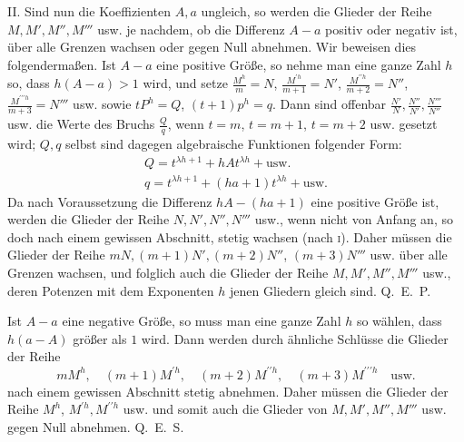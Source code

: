 II. Sind nun die Koeffizienten $A,a$ ungleich, so werden die Glieder der Reihe $M,M',M'',M'''$ usw. je nachdem, ob die Differenz $A-a$ positiv oder negativ ist, über alle Grenzen wachsen oder gegen Null abnehmen. Wir beweisen dies folgendermaßen. Ist $A-a$ eine positive Größe, so nehme man eine ganze Zahl $h$ so, dass $h(A-a)>1$ wird, und setze $\frac{M^h}{m}=N$, $\frac{M^{\prime h}}{m+1}=N'$, $\frac{M^{\prime\prime h}}{m+2}=N''$, $\frac{M^{\prime\prime\prime h}}{m+3}=N'''$ usw. sowie $tP^h=Q$, $(t+1)p^h=q$. Dann sind offenbar $\frac{N'}{N},\frac{N''}{N'},\frac{N'''}{N''}$ usw. die Werte des Bruchs $\frac{Q}{q}$, wenn $t=m$, $t=m+1$, $t=m+2$ usw. gesetzt wird; $Q,q$ selbst sind dagegen algebraische Funktionen folgender Form:
\[
\begin{array}{l}
Q=t^{\lambda h+1}+hAt^{\lambda h}+\mathrm{usw.}\\
q=t^{\lambda h+1}+(ha+1)t^{\lambda h}+\mathrm{usw.}
\end{array}
\]
Da nach Voraussetzung die Differenz $hA-(ha+1)$ eine positive Größe ist, werden die Glieder der Reihe $N,N',N'',N'''$ usw., wenn nicht von Anfang an, so doch nach einem gewissen Abschnitt, stetig wachsen (nach \textsc{i}). Daher müssen die Glieder der Reihe $mN,(m+1)N',(m+2)N''$, $(m+3)N'''$ usw. über alle Grenzen wachsen, und folglich auch die Glieder der Reihe $M,M',M'',M'''$ usw., deren Potenzen mit dem Exponenten $h$ jenen Gliedern gleich sind. Q.~E.~P.

Ist $A-a$ eine negative Größe, so muss man eine ganze Zahl $h$ so wählen, dass $h(a-A)$ größer als $1$ wird. Dann werden durch ähnliche Schlüsse die Glieder der Reihe
\[
mM^h,\quad (m+1)M^{\prime h},\quad (m+2)M^{\prime\prime h},\quad (m+3)M^{\prime\prime\prime h}\quad\mathrm{usw.}
\]
nach einem gewissen Abschnitt stetig abnehmen. Daher müssen die Glieder der Reihe $M^h$, $M^{\prime h},M^{\prime\prime h}$ usw. und somit auch die Glieder von $M,\allowbreak M',\allowbreak M'',\allowbreak M'''$ usw. gegen Null abnehmen. Q.~E.~S.

